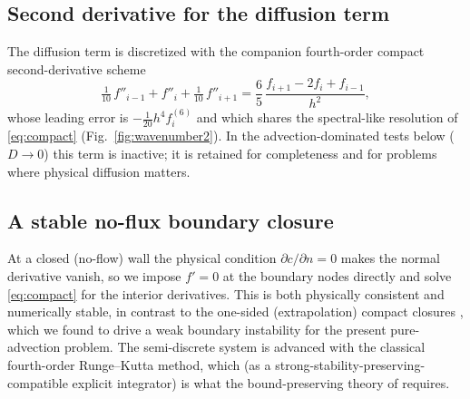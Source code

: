 \documentclass[Journal]{ascelike}   %
\begin{document}
\subsection{Second derivative for the diffusion term}
\label{sec:compact2}
The diffusion term is discretized with the companion fourth-order compact
second-derivative scheme \citep{lele1992}
\begin{equation}
\tfrac{1}{10}\,f''_{i-1}+f''_{i}+\tfrac{1}{10}\,f''_{i+1}
=\frac{6}{5}\,\frac{f_{i+1}-2f_i+f_{i-1}}{h^{2}},
\label{eq:compact2}
\end{equation}
whose leading error is $-\tfrac{1}{20}h^{4}f^{(6)}_i$ and which shares the
spectral-like resolution of \eqref{eq:compact} (Fig.~\ref{fig:wavenumber2}). In
the advection-dominated tests below ($D\to0$) this term is inactive; it is retained
for completeness and for problems where physical diffusion matters.

\subsection{A stable no-flux boundary closure}
\label{sec:bc}
At a closed (no-flow) wall the physical condition $\partial c/\partial n=0$ makes
the normal derivative vanish, so we impose $f'=0$ at the boundary nodes directly
and solve \eqref{eq:compact} for the interior derivatives. This is both physically
consistent and numerically stable, in contrast to the one-sided (extrapolation)
compact closures \citep{lele1992,carpenter1993}, which we found to drive a weak
boundary instability for the present pure-advection problem. The semi-discrete
system is advanced with the classical fourth-order Runge--Kutta method, which (as a
strong-stability-preserving-compatible explicit integrator) is what the
bound-preserving theory of \citet{lixiezhang2018} requires.
\end{document}

